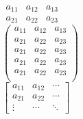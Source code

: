 \documentclass[a4paper, 12pt]{book}
\begin{document}
\(
\begin{array}{ccc}
  a_11 & a_12 & a_13 \\
  a_21 & a_22 & a_23
\end{array}
\)
\\[\baselineskip]

\(
  \left(
    \begin{array}{ccc}
      a_11 & a_12 & a_13 \\
      a_21 & a_22 & a_23 \\
      a_21 & a_22 & a_23 \\
      a_21 & a_22 & a_23 \\
      a_21 & a_22 & a_23 \\
    \end{array}
  \right)
\)
\\[\baselineskip]

\(
  \left[
    \begin{array}{ccc}
      a_11 & a_12 & \cdots \\
      a_21 & a_22 & \cdots \\
      \vdots & \cdots & \ddots
    \end{array}
  \right]
\)
\\[\baselineskip]
\end{document}
